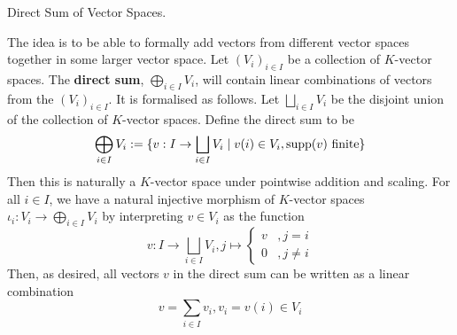 \documentclass[../../book.tex]{subfiles}
\begin{document}
\begin{dfn} Direct Sum of Vector Spaces.
    
    The idea is to be able to formally add vectors from different vector spaces
    together in some larger vector space.
    Let $(V_i)_{i\in I}$ be a collection of $K$-vector spaces.
    The \textbf{direct sum}, $\bigoplus_{i\in I}V_i$, 
    will contain linear combinations of vectors from the $(V_i)_{i\in I}$.
    It is formalised as follows. 
    Let $\bigsqcup_{i\in I} V_i$ be the disjoint union 
    of the collection of $K$-vector spaces.
    Define the direct sum to be \[
        \bigoplus_{i\in I} V_i := \{v : I \to \bigsqcup_{i\in I} V_i \mid 
        v(i) \in V_i, \mathrm{supp } (v) \text{ finite}\}
    \]
    Then this is naturally a $K$-vector space under pointwise addition and scaling.
    For all $i \in I$, we have a natural injective morphism of $K$-vector spaces 
    $\iota_i : V_i \to \bigoplus_{i\in I} V_i$ by interpreting
    $v \in V_i$ as the function \[
        v : I \to \bigsqcup_{i\in I} V_i, j \mapsto \begin{cases}
            v   &, j = i\\
            
            0   &, j \neq i
        \end{cases}
    \]
    Then, as desired, all vectors $v$ in the direct sum can be written as
    a linear combination \[
        v = \sum_{i \in I} v_i , v_i = v(i) \in V_i
    \]
\end{dfn}
\end{document}
